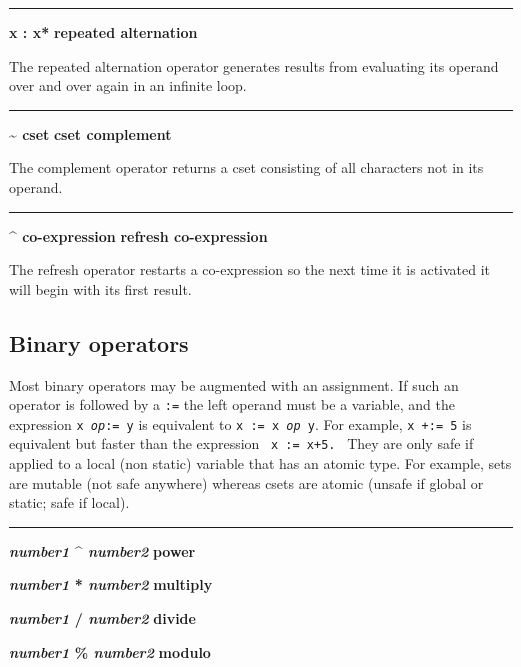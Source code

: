 \bigskip\hrule\vspace{0.1cm}
\noindent
{\bf {\textbar} x : x* } \hfill {\bf repeated alternation}

\noindent
The repeated alternation operator generates
results from evaluating its operand over and over again in an infinite
loop.

\bigskip\hrule\vspace{0.1cm}
\noindent
{\bf \~{} cset } \hfill {\bf cset complement}

\noindent
The complement operator returns a cset
consisting of all characters not in its operand.

\bigskip\hrule\vspace{0.1cm}
\noindent
{\bf \^{} co{}-expression } \hfill {\bf refresh co{}-expression}

\noindent
{}The refresh operator restarts a
co-expression so the next time it is activated it will begin with its
first result.

\subsection*{Binary operators}

Most binary operators may be augmented with an
assignment. If such an operator is followed
by a \texttt{:=} the left operand must be a variable, and the
expression \texttt{x }\texttt{\textit{op}}\texttt{:= y} is equivalent
to \texttt{x := x }\texttt{\textit{op}}\texttt{ y}. For example,
\texttt{x +:= 5} is equivalent but faster than the expression
\ \texttt{x := x+5.}
 \
They are only safe if applied to a local (non static) variable that
has an atomic type. For example, sets are mutable (not safe anywhere)
whereas csets are atomic (unsafe if global or static; safe if local).

\bigskip\hrule\vspace{0.1cm}
\noindent
{\bf \textit{number1} \^{} \textit{number2} } \hfill {\bf power}
\index{power, exponent \^{}}

\noindent
{\bf \textit{number1} * \textit{number2} } \hfill {\bf multiply}

\noindent
{\bf \textit{number1} / \textit{number2} } \hfill {\bf divide}

\noindent
{\bf \textit{number1} \% \textit{number2} } \hfill {\bf modulo}


